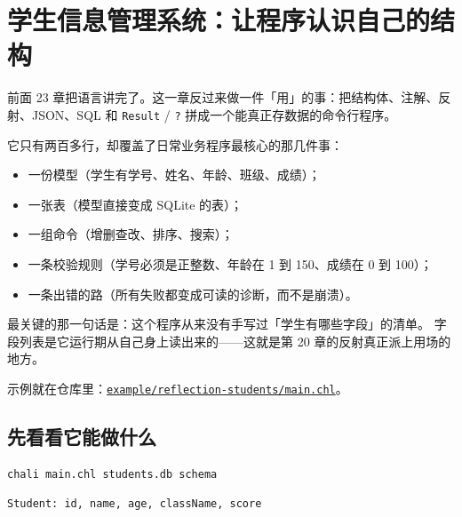 \chapter{学生信息管理系统：让程序认识自己的结构}
\label{ch:24}

前面 23 章把语言讲完了。这一章反过来做一件「用」的事：把结构体、注解、反射、JSON、SQL 和 \texttt{Result} / \texttt{?} 拼成一个能真正存数据的命令行程序。

它只有两百多行，却覆盖了日常业务程序最核心的那几件事：

\begin{itemize}

\item 一份模型（学生有学号、姓名、年龄、班级、成绩）；

\item 一张表（模型直接变成 SQLite 的表）；

\item 一组命令（增删查改、排序、搜索）；

\item 一条校验规则（学号必须是正整数、年龄在 1 到 150、成绩在 0 到 100）；

\item 一条出错的路（所有失败都变成可读的诊断，而不是崩溃）。

\end{itemize}

最关键的那一句话是：这个程序从来没有手写过「学生有哪些字段」的清单。 字段列表是它运行期从自己身上读出来的——这就是第 20 章的反射真正派上用场的地方。

示例就在仓库里：\href{https://gitee.com/rabbitc999/chali/blob/master/example/reflection-students/main.chl}{\texttt{example/\allowbreak{}reflection-students/\allowbreak{}main.\allowbreak{}chl}}。

\section{先看看它能做什么}

\par
\medskip
\begin{lstlisting}[style=sh]
chali main.chl students.db schema
\end{lstlisting}
\par
\medskip

\par
\medskip
\begin{lstlisting}[style=out]
Student: id, name, age, className, score
\end{lstlisting}
\par
\medskip


